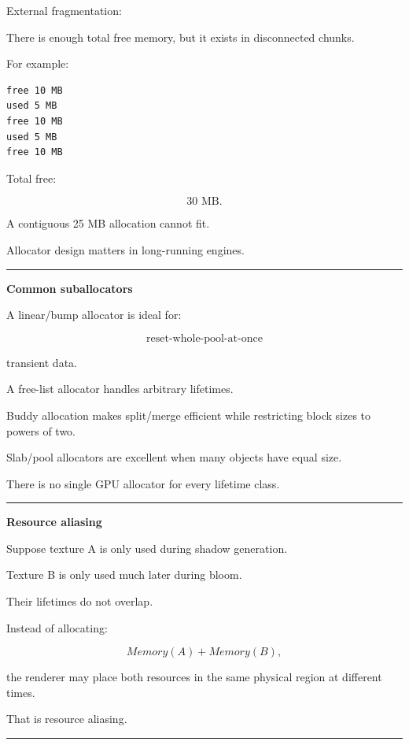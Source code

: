External fragmentation:

There is enough total free memory, but it exists in disconnected chunks.

For example:

\protect{}\label{p10-frag}%
\begin{verbatim}
free 10 MB
used 5 MB
free 10 MB
used 5 MB
free 10 MB
\end{verbatim}

Total free:

\[
30\text{ MB}.
\]

A contiguous 25 MB allocation cannot fit.

Allocator design matters in long-running engines.

\begin{center}\rule{0.5\linewidth}{0.5pt}\end{center}

\textbf{Common suballocators}

A linear/bump allocator is ideal for:

\[
\text{reset-whole-pool-at-once}
\]

transient data.

A free-list allocator handles arbitrary lifetimes.

Buddy allocation makes split/merge efficient while restricting block sizes to powers of two.

Slab/pool allocators are excellent when many objects have equal size.

There is no single GPU allocator for every lifetime class.

\begin{center}\rule{0.5\linewidth}{0.5pt}\end{center}

\textbf{Resource aliasing}

Suppose texture A is only used during shadow generation.

Texture B is only used much later during bloom.

Their lifetimes do not overlap.

Instead of allocating:

\[
Memory(A)+Memory(B),
\]

the renderer may place both resources in the same physical region at different times.

That is resource aliasing.

\begin{center}\rule{0.5\linewidth}{0.5pt}\end{center}

